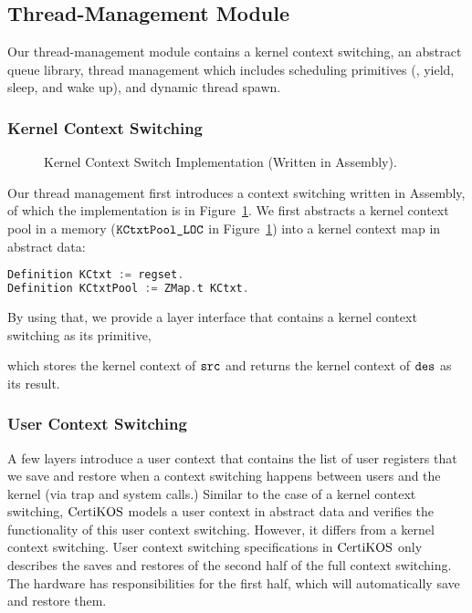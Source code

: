 \subsection{Thread-Management Module}
\label{chapter:certikos:subsec:process-management-module}
Our thread-management module contains 
a kernel context switching, an abstract queue library, thread management which includes scheduling primitives (\ie, yield, sleep, and wake up),
and dynamic thread spawn.

\subsubsection{Kernel Context Switching}

\begin{figure}
 
\caption{Kernel Context Switch Implementation (Written in Assembly).}
\label{fig:chapter:certikos:kernel-context-switch-impl}
\end{figure}
Our thread management first introduces a context switching written in Assembly, of which the implementation is in Figure~\ref{fig:chapter:certikos:kernel-context-switch-impl}.
We first abstracts a kernel context pool in a memory (${\mathrm{\texttt{KCtxtPool\_LOC}}}$ in Figure~\ref{fig:chapter:certikos:kernel-context-switch-impl}) 
into a kernel context map in abstract data:
\begin{lstlisting}[language = C, deletekeywords = {Context}]
Definition KCtxt := regset.
Definition KCtxtPool := ZMap.t KCtxt.
\end{lstlisting}
By using that, we provide a layer interface that contains a kernel context switching as its primitive,

which stores the kernel context of ${\mathrm{\texttt{src}}}$ and returns the kernel context of ${\mathrm{\texttt{des}}}$ as its result.


\subsubsection{User Context Switching}

A few layers introduce a user context that contains the list of user registers that we save and restore when 
a context switching happens between users and the kernel (via trap and system calls.)
Similar to the case of a kernel context switching, $\mathrm{CertiKOS}$ models a user context in abstract data and verifies the functionality of this user context switching. 
However, it differs from a kernel context switching.
User context switching specifications in $\mathrm{CertiKOS}$ only describes the saves and restores of the second half of the full context switching.
The hardware has responsibilities for the first half, which will automatically save and restore them.




